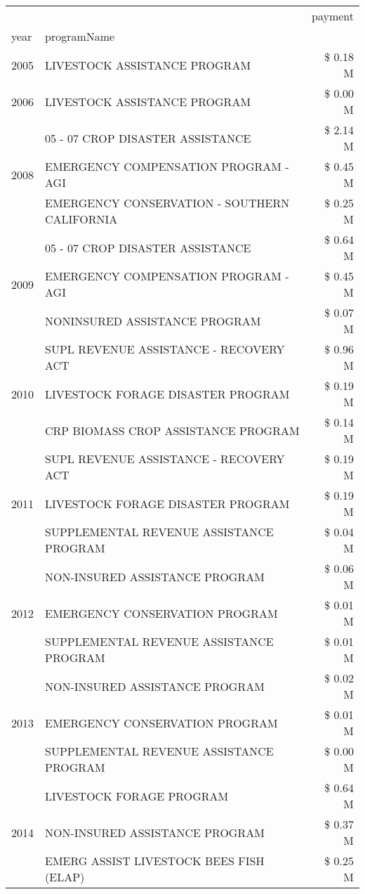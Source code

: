 \begin{tabular}{llr}
\toprule
 &  & payment \\
year & programName &  \\
\midrule
2005 & LIVESTOCK ASSISTANCE PROGRAM & \$ 0.18 M \\
\cline{1-3}
2006 & LIVESTOCK ASSISTANCE PROGRAM & \$ 0.00 M \\
\cline{1-3}
\multirow[t]{3}{*}{2008} & 05 - 07 CROP DISASTER ASSISTANCE & \$ 2.14 M \\
 & EMERGENCY COMPENSATION PROGRAM - AGI & \$ 0.45 M \\
 & EMERGENCY CONSERVATION - SOUTHERN CALIFORNIA & \$ 0.25 M \\
\cline{1-3}
\multirow[t]{3}{*}{2009} & 05 - 07 CROP DISASTER ASSISTANCE & \$ 0.64 M \\
 & EMERGENCY COMPENSATION PROGRAM - AGI & \$ 0.45 M \\
 & NONINSURED ASSISTANCE PROGRAM & \$ 0.07 M \\
\cline{1-3}
\multirow[t]{3}{*}{2010} & SUPL REVENUE ASSISTANCE - RECOVERY ACT & \$ 0.96 M \\
 & LIVESTOCK FORAGE DISASTER PROGRAM & \$ 0.19 M \\
 & CRP BIOMASS CROP ASSISTANCE PROGRAM & \$ 0.14 M \\
\cline{1-3}
\multirow[t]{3}{*}{2011} & SUPL REVENUE ASSISTANCE - RECOVERY ACT & \$ 0.19 M \\
 & LIVESTOCK FORAGE DISASTER PROGRAM & \$ 0.19 M \\
 & SUPPLEMENTAL REVENUE ASSISTANCE PROGRAM & \$ 0.04 M \\
\cline{1-3}
\multirow[t]{3}{*}{2012} & NON-INSURED ASSISTANCE PROGRAM & \$ 0.06 M \\
 & EMERGENCY CONSERVATION PROGRAM & \$ 0.01 M \\
 & SUPPLEMENTAL REVENUE ASSISTANCE PROGRAM & \$ 0.01 M \\
\cline{1-3}
\multirow[t]{3}{*}{2013} & NON-INSURED ASSISTANCE PROGRAM & \$ 0.02 M \\
 & EMERGENCY CONSERVATION PROGRAM & \$ 0.01 M \\
 & SUPPLEMENTAL REVENUE ASSISTANCE PROGRAM & \$ 0.00 M \\
\cline{1-3}
\multirow[t]{3}{*}{2014} & LIVESTOCK FORAGE PROGRAM & \$ 0.64 M \\
 & NON-INSURED ASSISTANCE PROGRAM & \$ 0.37 M \\
 & EMERG ASSIST LIVESTOCK BEES FISH (ELAP) & \$ 0.25 M \\

\end{tabular}
